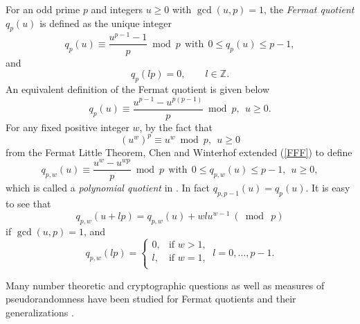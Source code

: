 \documentclass [11pt,a4paper]{article}
\begin{document}
For an odd prime $p$ and integers $u\ge 0$ with $\gcd(u,p)=1$, the {\it
Fermat quotient $q_p(u)$ \/} is defined as the unique integer
$$
q_p(u) \equiv \frac{u^{p-1} -1}{p} \bmod p ~~  \mathrm{with}~~ 0 \le
q_p(u) \le p-1,
$$
and
$$
q_p(lp) = 0, \qquad l \in \mathbb{Z}.
$$
An equivalent definition of the Fermat quotient is given below
\begin{equation}\label{FFF}
q_p(u)\equiv \frac{u^{p-1}-u^{p(p-1)}}{p}\bmod p, ~~ u\ge 0.
\end{equation}
For any fixed positive integer $w$, by the fact that
$$
(u^w)^{p}\equiv u^w \bmod p, ~~ u\ge 0
$$
from the Fermat Little Theorem, Chen and Winterhof extended (\ref{FFF})
to define
\begin{equation}\label{poly-def}
q_{p,w}(u)\equiv \frac{u^w-u^{wp}}{p} \bmod p ~~  \mathrm{with}~~ 0
\le q_{p,w}(u) \le p-1, ~~u\ge 0,
\end{equation}
which is called a \emph{polynomial quotient} in \cite{CW2}. In
fact $q_{p,p-1}(u)=q_{p}(u)$. It is easy to see that
\begin{equation}\label{addstruct}
q_{p,w}(u+lp) = q_{p,w}(u) + wl u^{w-1}~( \bmod~ p)
\end{equation}
if $\gcd(u,p)=1$, and
\begin{equation}\label{value-2}
q_{p,w}(lp) =\left\{
\begin{array}{ll}
0, & \mathrm{if}\,\, w>1,  \\
l, & \mathrm{if}\,\, w=1,  \\
\end{array}
\right. ~l=0,\ldots,p-1.
\end{equation}

Many number theoretic and cryptographic questions as well as
measures of pseudorandomness have been studied for Fermat quotients
and their generalizations
\cite{ADS,AW,BFKS,C,CD,CG,COW,CW2,CW,CW3,DCH,DKC,EM,GW,OS,Sha,Shk,S,S2010,S2011,S2011b,SW}.
\end{document}

